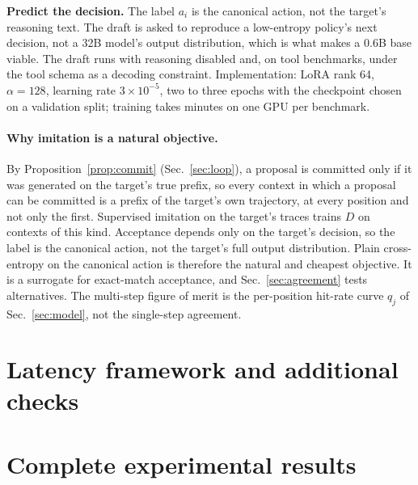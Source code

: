 \textbf{Predict the decision.} The label $a_i$ is the canonical action, not the target's reasoning text.
The draft is asked to reproduce a low-entropy policy's next decision, not a 32B model's output
distribution, which is what makes a 0.6B base viable. The draft runs with reasoning disabled and, on
tool benchmarks, under the tool schema as a decoding constraint. Implementation: LoRA rank 64,
$\alpha{=}128$, learning rate $3\times10^{-5}$, two to three epochs with the checkpoint chosen on a
validation split; training takes minutes on one GPU per benchmark.

\paragraph{Why imitation is a natural objective.}
By Proposition~\ref{prop:commit} (Sec.~\ref{sec:loop}), a proposal is committed only if it was generated
on the target's true prefix, so every context in which a proposal can be committed is a prefix of the
target's own trajectory, at every position and not only the first. Supervised imitation on the target's
traces trains $D$ on contexts of this kind. Acceptance depends only on the target's decision, so the label
is the canonical action, not the target's full output distribution. Plain cross-entropy on the canonical
action is therefore the natural and cheapest objective. It is a surrogate for exact-match acceptance, and
Sec.~\ref{sec:agreement} tests alternatives. The multi-step figure of merit is the per-position hit-rate
curve $q_j$ of Sec.~\ref{sec:model}, not the single-step agreement.



\section{Latency framework and additional checks}
\label{app:model}

\section{Complete experimental results}
\label{app:results}
\label{app:detail:experiments}
